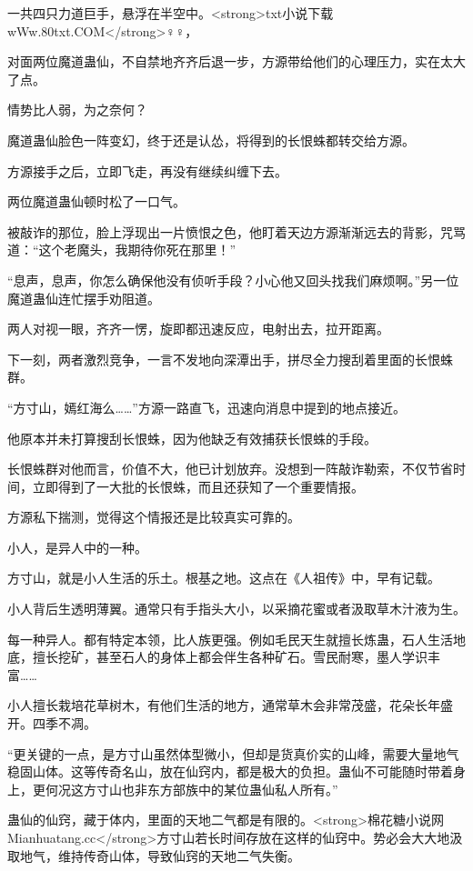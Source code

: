 
\begin{this_body}

一共四只力道巨手，悬浮在半空中。<strong>txt小说下载wWw.80txt.COM</strong>♀♀，

对面两位魔道蛊仙，不自禁地齐齐后退一步，方源带给他们的心理压力，实在太大了点。

情势比人弱，为之奈何？

魔道蛊仙脸色一阵变幻，终于还是认怂，将得到的长恨蛛都转交给方源。

方源接手之后，立即飞走，再没有继续纠缠下去。

两位魔道蛊仙顿时松了一口气。

被敲诈的那位，脸上浮现出一片愤恨之色，他盯着天边方源渐渐远去的背影，咒骂道：“这个老魔头，我期待你死在那里！”

“息声，息声，你怎么确保他没有侦听手段？小心他又回头找我们麻烦啊。”另一位魔道蛊仙连忙摆手劝阻道。

两人对视一眼，齐齐一愣，旋即都迅速反应，电射出去，拉开距离。

下一刻，两者激烈竞争，一言不发地向深潭出手，拼尽全力搜刮着里面的长恨蛛群。

“方寸山，嫣红海么……”方源一路直飞，迅速向消息中提到的地点接近。

他原本并未打算搜刮长恨蛛，因为他缺乏有效捕获长恨蛛的手段。

长恨蛛群对他而言，价值不大，他已计划放弃。没想到一阵敲诈勒索，不仅节省时间，立即得到了一大批的长恨蛛，而且还获知了一个重要情报。

方源私下揣测，觉得这个情报还是比较真实可靠的。

小人，是异人中的一种。

方寸山，就是小人生活的乐土。根基之地。这点在《人祖传》中，早有记载。

小人背后生透明薄翼。通常只有手指头大小，以采摘花蜜或者汲取草木汁液为生。

每一种异人。都有特定本领，比人族更强。例如毛民天生就擅长炼蛊，石人生活地底，擅长挖矿，甚至石人的身体上都会伴生各种矿石。雪民耐寒，墨人学识丰富……

小人擅长栽培花草树木，有他们生活的地方，通常草木会非常茂盛，花朵长年盛开。四季不凋。

“更关键的一点，是方寸山虽然体型微小，但却是货真价实的山峰，需要大量地气稳固山体。这等传奇名山，放在仙窍内，都是极大的负担。蛊仙不可能随时带着身上，更何况这方寸山也非东方部族中的某位蛊仙私人所有。”

蛊仙的仙窍，藏于体内，里面的天地二气都是有限的。<strong>棉花糖小说网Mianhuatang.cc</strong>方寸山若长时间存放在这样的仙窍中。势必会大大地汲取地气，维持传奇山体，导致仙窍的天地二气失衡。


\end{this_body}

